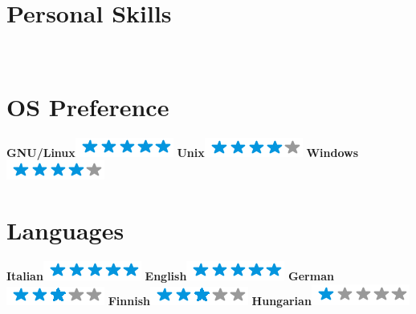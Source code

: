 \documentclass[]{friggeri-cv}
\begin{document}
\begin{aside}
  \section{Personal Skills}
    ~
    \section{OS Preference}
    \textbf{GNU/Linux}\includegraphics[scale=0.40]{img/5stars.png}
    \textbf{Unix}\includegraphics[scale=0.40]{img/4stars.png}
    \textbf{Windows}\includegraphics[scale=0.40]{img/4stars.png}
    ~
  \section{Languages}
    \textbf{Italian}\includegraphics[scale=0.40]{img/5stars.png}
    \textbf{English}\includegraphics[scale=0.40]{img/5stars.png}
    \textbf{German}\includegraphics[scale=0.40]{img/3stars.png}
    \textbf{Finnish}\includegraphics[scale=0.40]{img/3stars.png}
    \textbf{Hungarian}\includegraphics[scale=0.40]{img/1stars.png}
    ~
\end{aside}
\end{document}
